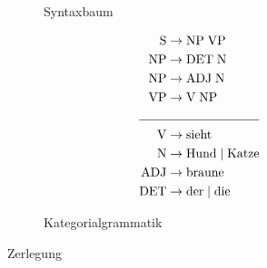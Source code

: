 \documentclass[a4paper]{sprach}
\newcommand{\cat}[1]{\text{#1}}
\begin{document}
\begin{figure}[ht]
  \centering
  \begin{subfigure}[b]{0.4\linewidth}
    \caption{Syntaxbaum}
  \end{subfigure}
  \begin{subfigure}[b]{0.4\linewidth}
    \begin{align*}
      \cat{S} &\rightarrow \cat{NP}\;\cat{VP}\\
      \cat{NP} &\rightarrow \cat{DET}\;\cat{N}\\
      \cat{NP} &\rightarrow \cat{ADJ}\;\cat{N}\\
      \cat{VP} &\rightarrow \cat{V}\;\cat{NP}\\\cline{1-2}
      \cat{V} &\rightarrow \text{sieht}\\
      \cat{N} &\rightarrow \text{Hund}\;|\;\text{Katze}\\
      \cat{ADJ} &\rightarrow \text{braune}\\
      \cat{DET} &\rightarrow \text{der}\;|\;\text{die}
    \end{align*}
    \caption{Kategorialgrammatik}
  \end{subfigure}
  \caption{Zerlegung}
\end{figure}
\end{document}

